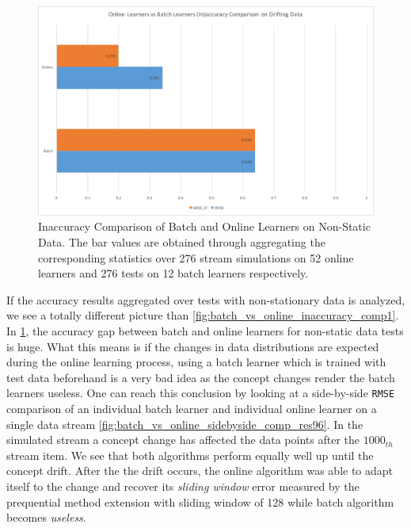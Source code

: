 \begin{figure}[htbp]
  \centering
    \includegraphics[width=\linewidth]{./Figures/batch_vs_online_inaccuracy_comp2.pdf}
  \caption{Inaccuracy Comparison of Batch and Online Learners on Non-Static Data. The bar values are obtained through aggregating the corresponding statistics over 276 stream simulations on 52 online learners and 276 tests on 12 batch learners respectively.}
  \label{fig:batch_vs_online_inaccuracy_comp2}
\end{figure}

If the accuracy results aggregated over tests with non-stationary data is analyzed, we see a totally different picture than \ref{fig:batch_vs_online_inaccuracy_comp1}. In \ref{fig:batch_vs_online_inaccuracy_comp2}, the accuracy gap between batch and online learners for non-static data tests is huge. What this means is if the changes in data distributions are expected during the online learning process, using a batch learner which is trained with test data beforehand is a very bad idea as the concept changes render the batch learners useless. One can reach this conclusion by looking at a side-by-side \texttt{RMSE} comparison of an individual batch learner and individual online learner on a single data stream \ref{fig:batch_vs_online_sidebyside_comp_res96}. In the simulated stream a concept change has affected the data points after the $1000_{th}$ stream item. We see that both algorithms perform equally well up until the concept drift. After the the drift occurs, the online algorithm was able to adapt itself to the change and recover its \textit{sliding window} error measured by the prequential method extension with sliding window of 128 while batch algorithm becomes \textit{useless}.


